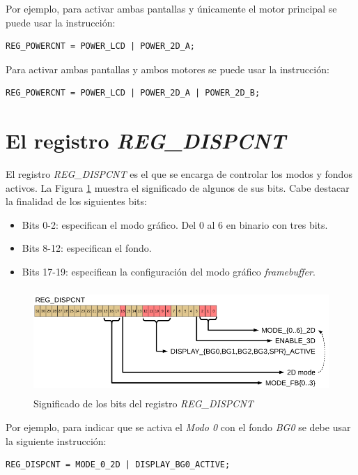 Por ejemplo, para activar ambas pantallas y únicamente el motor principal se puede usar la instrucción:
\begin{verbatim}
REG_POWERCNT = POWER_LCD | POWER_2D_A;
\end{verbatim}

Para activar ambas pantallas y ambos motores se puede usar la instrucción:
\begin{verbatim}
REG_POWERCNT = POWER_LCD | POWER_2D_A | POWER_2D_B;
\end{verbatim}

\section{El registro \textit{REG\_DISPCNT}} 
El registro \textit{REG\_DISPCNT} es el que se encarga de controlar los modos y fondos activos. La Figura \ref{fig_c5_reg_dispcnt3} muestra el significado de algunos de sus bits. Cabe destacar la finalidad de los siguientes bits:

\begin{itemize}
	\item Bits 0-2: especifican el modo gráfico. Del 0 al 6 en binario con tres bits.
	\item Bits 8-12: especifican el fondo.
	\item Bits 17-19: especifican la configuración del modo gráfico \textit{framebuffer}.
\end{itemize}

\begin{figure}[t]
\centering
\includegraphics[height=4cm]{Figuras/C5/c5_reg_dispcnt3.png}
\caption{Significado de los bits del registro \textit{REG\_DISPCNT}}
\label{fig_c5_reg_dispcnt3}
\end{figure}

Por ejemplo, para indicar que se activa el \textit{Modo 0} con el fondo \textit{BG0} se debe usar la siguiente instrucción:

\begin{verbatim}
REG_DISPCNT = MODE_0_2D | DISPLAY_BG0_ACTIVE;
\end{verbatim}

